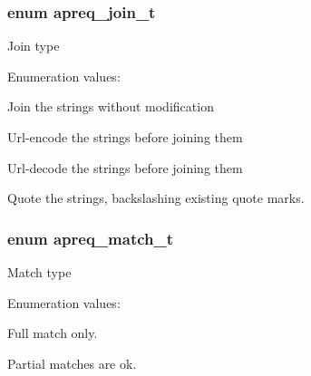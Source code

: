 \subsubsection{\setlength{\rightskip}{0pt plus 5cm}enum apreq\_\-join\_\-t}\label{group__Utils_a36}


Join type \begin{Desc}
\item[Enumeration values:]\par
\begin{description}
\item[{\em 
{\em AS\_\-IS}\label{group__Utils_a36a15}
}]Join the strings without modification \item[{\em 
{\em ENCODE}\label{group__Utils_a36a16}
}]Url-encode the strings before joining them \item[{\em 
{\em DECODE}\label{group__Utils_a36a17}
}]Url-decode the strings before joining them \item[{\em 
{\em QUOTE}\label{group__Utils_a36a18}
}]Quote the strings, backslashing existing quote marks. \end{description}
\end{Desc}

\subsubsection{\setlength{\rightskip}{0pt plus 5cm}enum apreq\_\-match\_\-t}\label{group__Utils_a37}


Match type \begin{Desc}
\item[Enumeration values:]\par
\begin{description}
\item[{\em 
{\em FULL}\label{group__Utils_a37a19}
}]Full match only. \item[{\em 
{\em PARTIAL}\label{group__Utils_a37a20}
}]Partial matches are ok. \end{description}
\end{Desc}



